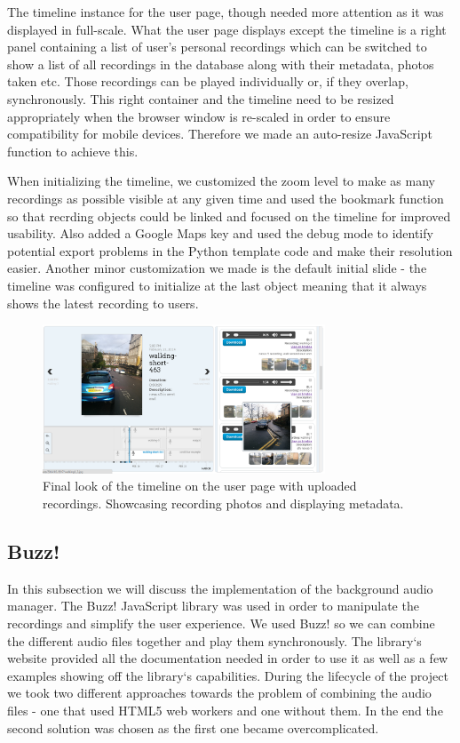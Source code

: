 \documentclass{l3proj}
\begin{document}
The timeline instance for the user page, though needed more attention as it was displayed in full-scale. What the user page displays except the timeline is a right panel containing a list of user's personal recordings which can be switched to show a list of all recordings in the database along with their metadata, photos taken etc.
Those recordings can be played individually or, if they overlap, synchronously. This right container and the timeline need to be resized appropriately when the browser window is re-scaled in order to ensure compatibility for mobile devices.
Therefore we made an auto-resize JavaScript function to achieve this.

When initializing the timeline, we customized the zoom level to make as many recordings as possible visible at any given time and used the bookmark function so that recrding objects could be linked and focused on the timeline for improved usability.
Also added a Google Maps key and used the debug mode to identify potential export problems in the Python template code and make their resolution easier. Another minor customization we made is the default initial slide - the timeline was configured to initialize at the last object meaning that it always shows the latest recording to users.

\begin{figure}[ht!]
  \centering
\includegraphics[width=0.75\textwidth]{images/timeline_final.png}
\caption{Final look of the timeline on the user page with uploaded recordings. Showcasing recording photos and displaying metadata.}
\end{figure}

\subsection{Buzz!}
In this subsection we will discuss the implementation of the background audio manager. The Buzz! JavaScript library was used in order to manipulate the recordings and simplify the user experience. We used Buzz! so we can combine the different audio files together and play them synchronously. The library`s website provided all the documentation needed in order to use it as well as a few examples showing off the library`s capabilities. During the lifecycle of the project we took two different approaches towards the problem of combining the audio files - one that used HTML5 web workers and one without them. In the end the second solution was chosen as the first one became overcomplicated.
\end{document}
